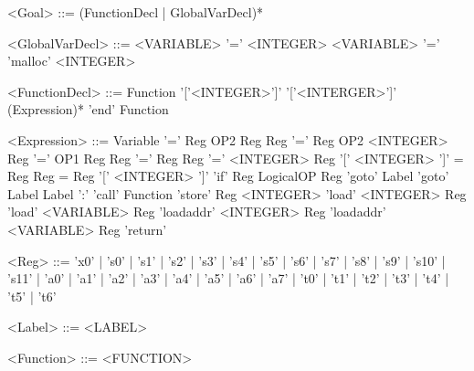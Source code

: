 \documentclass{ctexart}
\newenvironment{typewriterfont}{\ttfamily}{\par}
\begin{document}
\begin{typewriterfont}
\begin{grammar}
<Goal>  ::= (FunctionDecl | GlobalVarDecl)*

<GlobalVarDecl> ::= <VARIABLE> '=' <INTEGER>
\alt <VARIABLE> '=' 'malloc' <INTEGER>

<FunctionDecl> ::= Function '['<INTEGER>']' '['<INTERGER>']' (Expression)* 'end' Function

<Expression>	::=	Variable '=' Reg OP2 Reg
\alt Reg '=' Reg OP2 <INTEGER>
\alt Reg '=' OP1 Reg
\alt Reg '=' Reg
\alt Reg '=' <INTEGER>
\alt Reg '[' <INTEGER> ']' = Reg
\alt Reg = Reg '[' <INTEGER> ']'
\alt 'if' Reg LogicalOP Reg 'goto' Label
\alt 'goto' Label
\alt Label ':'
\alt 'call' Function
\alt 'store' Reg <INTEGER>
\alt 'load' <INTEGER> Reg
\alt 'load' <VARIABLE> Reg
\alt 'loadaddr' <INTEGER> Reg
\alt 'loadaddr' <VARIABLE> Reg
\alt 'return'

<Reg> ::= 'x0'
| 's0'
| 's1'
| 's2'
| 's3'
| 's4'
| 's5'
| 's6'
| 's7'
| 's8'
| 's9'
| 's10'
| 's11'
| 'a0'
| 'a1'
| 'a2'
| 'a3'
| 'a4'
| 'a5'
| 'a6'
| 'a7'
| 't0'
| 't1'
| 't2'
| 't3'
| 't4'
| 't5'
| 't6'

<Label> ::= <LABEL>

<Function> ::= <FUNCTION>

\end{grammar}
\end{typewriterfont}
\end{document}
